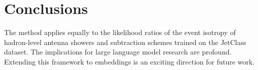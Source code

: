 \section{Conclusions}\label{sec:conclusions}

The method applies equally to the likelihood ratios of the event
isotropy of hadron-level antenna showers and subtraction schemes trained
on the JetClass dataset. The implications for large language model
research are profound. Extending this framework to embeddings is an
exciting direction for future work.

